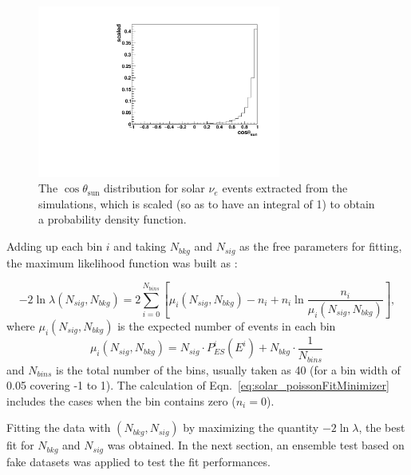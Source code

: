 \begin{figure}[!htb]
	\centering
	\includegraphics[width=8cm]{solarPDF.pdf}
	\caption[The $\cos\theta_\mathrm{sun}$ distribution of solar $\nu_e$ used as a PDF function.]{The $\cos\theta_\mathrm{sun}$ distribution for solar $\nu_e$ events extracted from the simulations, which is scaled (so as to have an integral of 1) to obtain a probability density function.}
	\label{solarPDF}
\end{figure}

Adding up each bin $i$ and taking $N_{bkg}$ and $N_{sig}$ as the free parameters for fitting, the maximum likelihood function was built as \cite{pdg2020}:

\begin{equation}\label{eq:solar_poissonFitMinimizer}
-2\ln\mathcal \lambda(N_{sig},N_{bkg})
=2\sum_{i=0}^{N_{bins}}[\mu_i(N_{sig},N_{bkg})-n_i+n_i\ln\frac{n_i}{\mu_i(N_{sig},N_{bkg})}],
\end{equation}
where $\mu_i(N_{sig},N_{bkg})$ is the expected number of events in each bin
\begin{equation*}
\mu_i(N_{sig},N_{bkg})=N_{sig}\cdot P^i_{ES}(E^i)+N_{bkg}\cdot\frac{1}{N_{bins}}\,
\end{equation*}
and $N_{bins}$ is the total number of the bins, usually taken as 40 (for a bin width of 0.05 covering -1 to 1). The calculation of Eqn.~\ref{eq:solar_poissonFitMinimizer} includes the cases when the bin contains zero ($n_i=0$).

Fitting the data with $(N_{bkg},N_{sig})$ by maximizing the quantity $-2\ln\mathcal\lambda$, the best fit for $N_{bkg}$ and $N_{sig}$ was obtained. In the next section, an ensemble test based on fake datasets was applied to test the fit performances.
%
%
